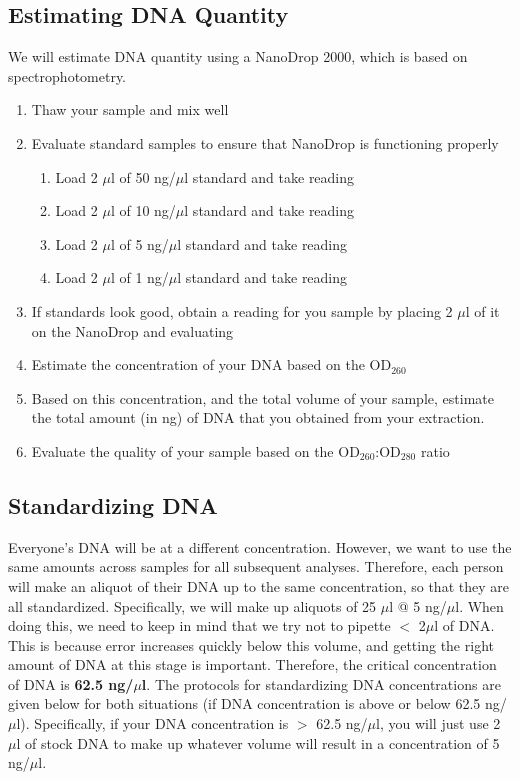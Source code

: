 \documentclass[12pt, hidelinks]{article}
\begin{document}
	\subsection{Estimating DNA Quantity}	
	We will estimate DNA quantity using a NanoDrop 2000, which is based on spectrophotometry.

		\begin{enumerate}
			\item Thaw your sample and mix well
			\item Evaluate standard samples to ensure that NanoDrop is functioning properly
				\begin{enumerate}
					\item Load 2 $\mu$l of 50 ng/$\mu$l standard and take reading
					\item Load 2 $\mu$l of 10 ng/$\mu$l standard and take reading
					\item Load 2 $\mu$l of 5 ng/$\mu$l standard and take reading
					\item Load 2 $\mu$l of 1 ng/$\mu$l standard and take reading	
				\end{enumerate}
			\item If standards look good, obtain a reading for you sample by placing 2 $\mu$l of it on the NanoDrop and evaluating
			\item Estimate the concentration of your DNA based on the OD$_{260}$
			\item Based on this concentration, and the total volume of your sample, estimate the total amount (in ng) of DNA that you obtained from your extraction.
			\item Evaluate the quality of your sample based on the OD$_{260}$:OD$_{280}$ ratio
		\end{enumerate}	


	\subsection{Standardizing DNA}
	Everyone's DNA will be at a different concentration. However, we want to use the same amounts across samples for all subsequent analyses. Therefore, each person will make an aliquot of their DNA up to the same concentration, so that they are all standardized. Specifically, we will make up aliquots of 25 $\mu$l @ 5 ng/$\mu$l. When doing this, we need to keep in mind that we try not to pipette $<$ 2$\mu$l of DNA. This is because error increases quickly below this volume, and getting the right amount of DNA at this stage is important. Therefore, the critical concentration of DNA is \textbf{62.5 ng/$\mu$l}. The protocols for standardizing DNA concentrations are given below for both situations (if DNA concentration is above or below 62.5 ng/$\mu$l). Specifically, if your DNA concentration is $>$ 62.5 ng/$\mu$l, you will just use 2 $\mu$l of stock DNA to make up whatever volume will result in a concentration of 5 ng/$\mu$l.
\end{document}

